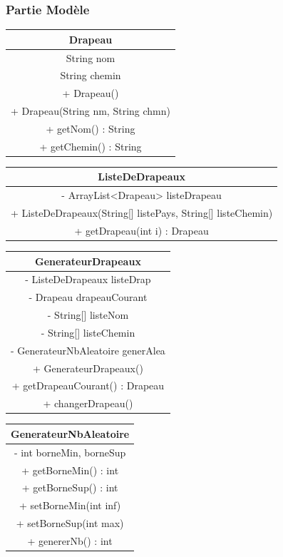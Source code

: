 \documentclass{article}
\begin{document}
\subsubsection{Partie Modèle}
\begin{center}
\begin{tabular}{|c|}
	\hline
	Drapeau\\
	\hline
	String nom\\
	String chemin\\
	\hline
	+ Drapeau()\\
	+ Drapeau(String nm, String chmn)\\
	+ getNom() : String\\
	+ getChemin() : String\\
	\hline
\end{tabular}
\begin{tabular}{|c|}
	\hline
	ListeDeDrapeaux\\
	\hline
	- ArrayList<Drapeau> listeDrapeau\\
	\hline
	+ ListeDeDrapeaux(String[] listePays, String[] listeChemin)\\
	+ getDrapeau(int i) : Drapeau\\
	\hline
\end{tabular}
\begin{tabular}{|c|}
	\hline
	GenerateurDrapeaux\\
	\hline
	- ListeDeDrapeaux listeDrap\\
	- Drapeau drapeauCourant\\
	- String[] listeNom\\
	- String[] listeChemin \\
	- GenerateurNbAleatoire generAlea\\
	\hline
	+ GenerateurDrapeaux()\\
	+ getDrapeauCourant() : Drapeau\\
	+ changerDrapeau()\\
	\hline
\end{tabular}
\hspace{2cm} \begin{tabular}{|c|}
	\hline
	GenerateurNbAleatoire\\
	\hline
	- int borneMin, borneSup\\
	\hline
	+ getBorneMin() : int\\
	+ getBorneSup() : int\\
	+ setBorneMin(int inf)\\
	+ setBorneSup(int max)\\
	+ genererNb() : int\\

\end{tabular}
\end{center}
\end{document}

